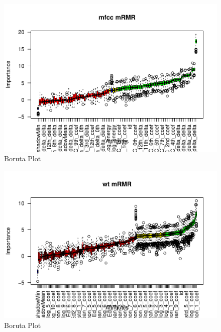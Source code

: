 \documentclass[
]{article}
\begin{document}
\begin{landscape}
\begin{figure}
{\centering \includegraphics[width=1\linewidth,height=1\textheight]{figure/borutaPlot-5} 

}

\caption{\label{fig:borutaPlot}Boruta Plot}\label{fig:borutaPlot-5}
\end{figure}
\begin{figure}

{\centering \includegraphics[width=1\linewidth,height=1\textheight]{figure/borutaPlot-6} 

}

\caption{\label{fig:borutaPlot}Boruta Plot}\label{fig:borutaPlot-6}
\end{figure}
\begin{figure}


\end{figure}
\end{landscape}
\end{document}
